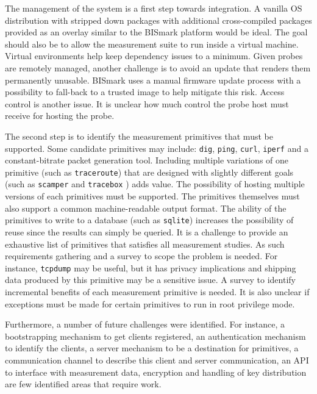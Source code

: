 
The management of the system is a first step towards integration. A vanilla OS
distribution with stripped down packages with additional cross-compiled
packages provided as an overlay similar to the BISmark platform
\cite{ssundaresan:usenix:2014} would be ideal. The goal should also be to
allow the measurement suite to run inside a virtual machine.  Virtual
environments help keep dependency issues to a minimum. Given probes are
remotely managed, another challenge is to avoid an update that renders them
permanently unusable.  BISmark uses a manual firmware update process with a
possibility to fall-back to a trusted image to help mitigate this risk.
Access control is another issue. It is unclear how much control the probe host
must receive for hosting the probe.


The second step is to identify the measurement primitives that must be
supported. Some candidate primitives may include: \texttt{dig}, \texttt{ping},
\texttt{curl}, \texttt{iperf} and a constant-bitrate packet generation tool.
Including multiple variations of one primitive (such as \texttt{traceroute})
that are designed with slightly different goals (such as \texttt{scamper}
\cite{mluckie:imc:2010} and \texttt{tracebox} \cite{gdetal:imc:2013}) adds
value. The possibility of hosting multiple versions of each primitives must be
supported. The primitives themselves must also support a common
machine-readable output format.  The ability of the primitives to write to a
database (such as \texttt{sqlite}) increases the possibility of reuse since
the results can simply be queried.  It is a challenge to provide an exhaustive
list of primitives that satisfies all measurement studies. As such
requirements gathering and a survey to scope the problem is needed. For
instance, \texttt{tcpdump} may be useful, but it has privacy implications and
shipping data produced by this primitive may be a sensitive issue. A survey
to identify incremental benefits of each measurement primitive is needed.
It is also unclear if exceptions must be made for certain primitives to run in
root privilege mode.

Furthermore, a number of future challenges were identified. For instance, a
bootstrapping mechanism to get clients registered, an authentication mechanism
to identify the clients, a server mechanism to be a destination for
primitives, a communication channel to describe this client and server
communication, an API to interface with measurement data, encryption and
handling of key distribution are few identified areas that require work.
